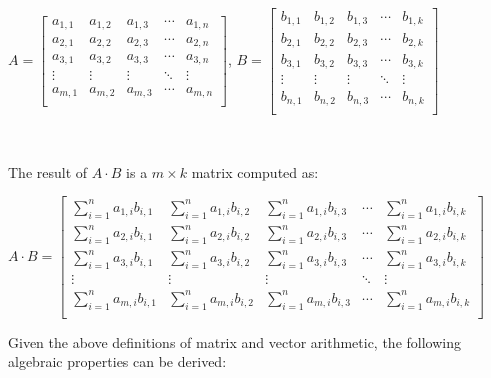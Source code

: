 \begin{tcolorbox}[title={\textbf{\tboxdef{\ref*{subsec:matrix-arithmetic}} Matrix Arithmetic}}]
\begin{itemize}
$A = \begin{bmatrix}
 a_{1, 1} & a_{1, 2} & a_{1, 3} & \cdots & a_{1, n}\\
 a_{2, 1} & a_{2, 2} & a_{2, 3} & \cdots & a_{2, n} \\
 a_{3, 1} & a_{3, 2} & a_{3, 3} & \cdots & a_{3, n} \\
\vdots & \vdots & \vdots & \ddots & \vdots \\
 a_{m, 1} & a_{m, 2} & a_{m, 3} & \cdots & a_{m, n} \\
\end{bmatrix}$, $B = \begin{bmatrix}
 b_{1, 1} & b_{1, 2} & b_{1, 3} & \cdots & b_{1, k}\\
 b_{2, 1} & b_{2, 2} & b_{2, 3} & \cdots & b_{2, k} \\
 b_{3, 1} & b_{3, 2} & b_{3, 3} & \cdots & b_{3, k} \\
\vdots & \vdots & \vdots & \ddots & \vdots \\
 b_{n, 1} & b_{n, 2} & b_{n, 3} & \cdots & b_{n, k} \\
\end{bmatrix}$

$ $

The result of $A \cdot B$ is a $m \times k$ matrix computed as:

$A \cdot B = \begin{bmatrix}
\sum\limits_{i=1}^{n}a_{1, i}b_{i, 1} & \sum\limits_{i=1}^{n}a_{1, i}b_{i, 2} & \sum\limits_{i=1}^{n}a_{1, i}b_{i, 3} & \cdots & \sum\limits_{i=1}^{n}a_{1, i}b_{i, k} \\
\sum\limits_{i=1}^{n}a_{2, i}b_{i, 1} & \sum\limits_{i=1}^{n}a_{2, i}b_{i, 2} & \sum\limits_{i=1}^{n}a_{2, i}b_{i, 3} & \cdots & \sum\limits_{i=1}^{n}a_{2, i}b_{i, k} \\
\sum\limits_{i=1}^{n}a_{3, i}b_{i, 1} & \sum\limits_{i=1}^{n}a_{3, i}b_{i, 2} & \sum\limits_{i=1}^{n}a_{3, i}b_{i, 3} & \cdots & \sum\limits_{i=1}^{n}a_{3, i}b_{i, k} \\
\vdots & \vdots & \vdots & \ddots & \vdots \\
\sum\limits_{i=1}^{n}a_{m, i}b_{i, 1}
& \sum\limits_{i=1}^{n}a_{m, i}b_{i, 2} & \sum\limits_{i=1}^{n}a_{m, i}b_{i, 3} & \cdots & \sum\limits_{i=1}^{n}a_{m, i}b_{i, k} \\
\end{bmatrix}$


\end{itemize}
\end{tcolorbox}

Given the above definitions of matrix and vector arithmetic, the following algebraic properties can be derived:

